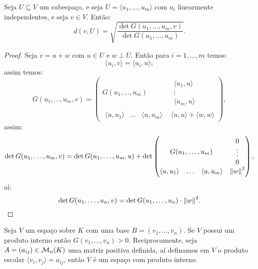 \documentclass[11pt,twoside,a4paper]{book}
\begin{document}
\begin{proposicao}
Seja $U\subseteq V$ um subespaço, e seja $U=\langle u_1,\dots,u_m\rangle$ com $u_i$ linearmente independentes, e seja $v\in V$. Então:
\[
d(v,U)=\sqrt{\frac{\det G(u_1,\dots,u_m,v)}{\det G(u_1,\dots,u_m)}}.
\]
\end{proposicao}
\begin{proof}
Seja $v=u+w$ com $u\in U$ e $w\perp U$. Então para $i=1,\dots,m$ temos:
\[
\langle u_i,v\rangle=\langle u_i,u\rangle;
\]
assim temos:
\[
G(u_1,\dots,u_m,v)=\begin{pmatrix}
G(u_1,\dots,u_m)&\begin{matrix}\langle u_1,u\rangle\\\vdots\\\langle u_m,u\rangle\end{matrix}\\\begin{matrix}\langle u,u_1\rangle&\ldots&\langle u,u_m\rangle\end{matrix}&\langle u,u\rangle+\langle w,w\rangle
\end{pmatrix},
\]
assim:
\[
\det G(u_1,\dots,u_m,v)=\det G(u_1,\dots,u_m,u)+\det\begin{pmatrix}
G(u_1,\dots,u_m)&\begin{matrix}0\\\vdots\\0\end{matrix}\\\begin{matrix}\langle u,u_1\rangle&\ldots&\langle u,u_m\rangle\end{matrix}&\norm{w}^2
\end{pmatrix},
\]
aí:
\[
\det G(u_1,\dots,u_n,v)=\det G(u_1,\dots,u_n)\cdot\norm{w}^2.
\]
\end{proof}

\begin{proposicao}
Seja $V$ um espaço sobre $K$ com uma base $B=(v_1,\dots,v_n)$. Se $V$ possui um produto interno então $G(v_1,\dots,v_n)>0$. Reciprocamente, seja $A=(a_{ij})\in\mathcal{M}_{n}(K)$ uma matriz positiva definida, aí definamos em $V$ o produto escalar $\langle v_i,v_j\rangle=a_{ij}$, então $V$ é um espaço com produto interno.
\end{proposicao}
\end{document}
